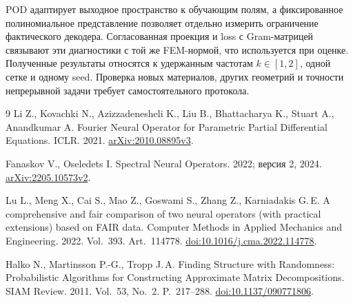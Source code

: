 \documentclass[notitle]{sibjima_preview}
\begin{document}
POD адаптирует выходное пространство к обучающим полям, а фиксированное полиномиальное представление позволяет отдельно измерить ограничение фактического декодера. Согласованная проекция и loss с Gram-матрицей связывают эти диагностики с той же FEM-нормой, что используется при оценке. Полученные результаты относятся к удержанным частотам \(k\in[1,2]\), одной сетке и одному seed. Проверка новых материалов, других геометрий и точности непрерывной задачи требует самостоятельного протокола.

\begin{thebibliography}{9}
Li Z., Kovachki N., Azizzadenesheli K., Liu B., Bhattacharya K., Stuart A., Anandkumar A.
Fourier Neural Operator for Parametric Partial Differential Equations.
ICLR. 2021. \href{https://arxiv.org/abs/2010.08895v3}{arXiv:2010.08895v3}.

Fanaskov V., Oseledets I.
Spectral Neural Operators.
2022; версия 2, 2024. \href{https://arxiv.org/abs/2205.10573v2}{arXiv:2205.10573v2}.

Lu L., Meng X., Cai S., Mao Z., Goswami S., Zhang Z., Karniadakis G.\,E.
A comprehensive and fair comparison of two neural operators (with practical extensions) based on FAIR data.
Computer Methods in Applied Mechanics and Engineering. 2022. Vol.~393. Art.~114778.
\href{https://doi.org/10.1016/j.cma.2022.114778}{doi:10.1016/j.cma.2022.114778}.

Halko N., Martinsson P.-G., Tropp J.\,A.
Finding Structure with Randomness: Probabilistic Algorithms for Constructing Approximate Matrix Decompositions.
SIAM Review. 2011. Vol.~53, No.~2. P.~217--288.
\href{https://doi.org/10.1137/090771806}{doi:10.1137/090771806}.
\end{thebibliography}
\end{document}
